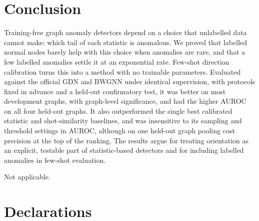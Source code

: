 \documentclass[pdflatex,sn-mathphys-ay]{sn-jnl}
\theoremstyle{plain}
\theoremstyle{remark}
\begin{document}
\section{Conclusion}\label{sec:conclusion}

Training-free graph anomaly detectors depend on a choice that unlabelled data cannot make: which tail of each statistic is anomalous. We proved that labelled normal nodes barely help with this choice when anomalies are rare, and that a few labelled anomalies settle it at an exponential rate. Few-shot direction calibration turns this into a method with no trainable parameters. Evaluated against the official GDN and BWGNN under identical supervision, with protocols fixed in advance and a held-out confirmatory test, it was better on most development graphs, with graph-level significance, and had the higher AUROC on all four held-out graphs. It also outperformed the single best calibrated statistic and shot-similarity baselines, and was insensitive to its sampling and threshold settings in AUROC, although on one held-out graph pooling cost precision at the top of the ranking. The results argue for treating orientation as an explicit, testable part of statistic-based detectors and for including labelled anomalies in few-shot evaluation.

\backmatter

Not applicable.

\section*{Declarations}
\end{document}
